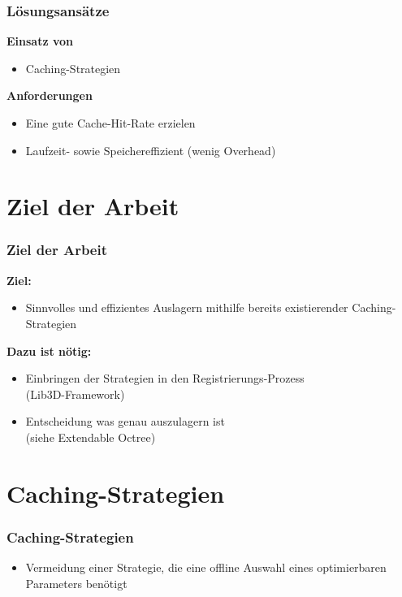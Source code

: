 \documentclass[presentation]{beamer}
\begin{document}
\begin{frame}
\frametitle{Lösungsansätze} 
\color{dd-gray} \textbf{Einsatz von } \color{black} 
\begin{itemize}
	\item Caching-Strategien %
\end{itemize}

\color{dd-gray} \textbf{Anforderungen} \color{black} 
\begin{itemize}
\item Eine gute Cache-Hit-Rate erzielen
\item Laufzeit- sowie Speichereffizient (wenig Overhead)
\end{itemize}
\end{frame}

\section{Ziel der Arbeit}
\begin{frame}
	\frametitle{Ziel der Arbeit} %
	\color{dd-gray} \textbf{Ziel:} \color{black} 
	\begin{itemize}
	\item Sinnvolles und effizientes Auslagern mithilfe bereits existierender Caching-Strategien
	\end{itemize}
	
	\color{dd-gray} \textbf{Dazu ist nötig:} \color{black} 
	\begin{itemize} 
	\item Einbringen der Strategien in den Registrierungs-Prozess \\ (Lib3D-Framework)  %
	\item Entscheidung was genau auszulagern ist \\ (siehe Extendable Octree)
	\end{itemize}
\end{frame}


\section{Caching-Strategien}

\begin{frame}
\frametitle{Caching-Strategien}
\begin{itemize}
	\item Vermeidung einer Strategie, die eine offline Auswahl eines optimierbaren Parameters benötigt
\end{itemize}
\end{frame}
\end{document}
